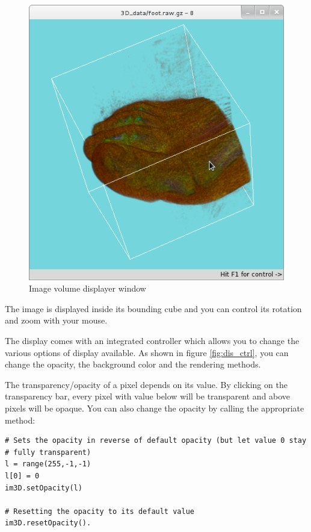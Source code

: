 \documentclass[a4paper,10pt,oneside]{article}
\begin{document}
\begin{figure}
\centering
\includegraphics[scale=0.5]{display_base.png}
\caption{Image volume displayer window}
\label{fig:dis_base}
\end{figure}

The image is displayed inside its bounding cube and you can control its rotation
and zoom with your mouse.

The display comes with an integrated controller which allows you to change
the various options of display available. As shown in figure \ref{fig:dis_ctrl},
you can change the opacity, the background color and the rendering methods.

The transparency/opacity of a pixel depends on its value. By clicking on the 
transparency bar, every pixel with value below will be transparent and above
pixels will be opaque. You can also change the opacity by calling the 
appropriate method:

\lstset{language=Python}
\begin{lstlisting}
# Sets the opacity in reverse of default opacity (but let value 0 stay 
# fully transparent)
l = range(255,-1,-1)
l[0] = 0
im3D.setOpacity(l)

# Resetting the opacity to its default value
im3D.resetOpacity().
\end{lstlisting}
\end{document}
